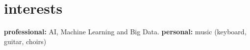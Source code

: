 \documentclass[]{cv-style}          %
\begin{document}







\section{interests}
  \vspace{-0.2cm}

\textbf{professional:} AI, Machine Learning and Big Data. \textbf{personal:} music (keyboard, guitar, choirs)

\end{document}
